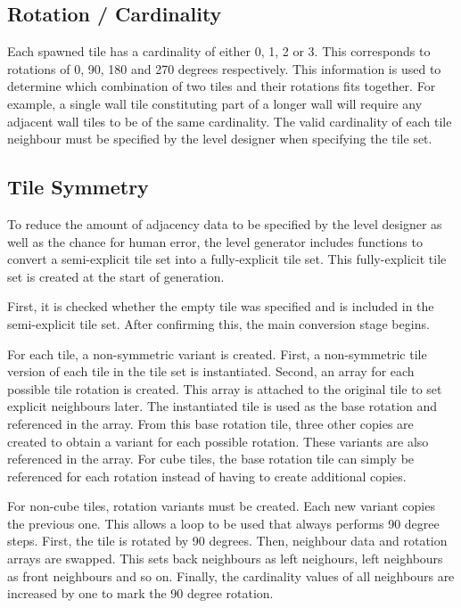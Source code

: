 \subsection{Rotation / Cardinality}
Each spawned tile has a cardinality of either 0, 1, 2 or 3. This corresponds to rotations of 0, 90, 180 and 270 degrees respectively. This information is used to determine which combination of two tiles and their rotations fits together. For example, a single wall tile constituting part of a longer wall will require any adjacent wall tiles to be of the same cardinality. The valid cardinality of each tile neighbour must be specified by the level designer when specifying the tile set.

\subsection{Tile Symmetry}\label{sec:tileSymmetry}
To reduce the amount of adjacency data to be specified by the level designer as well as the chance for human error, the level generator includes functions to convert a semi-explicit tile set into a fully-explicit tile set. This fully-explicit tile set is created at the start of generation.

First, it is checked whether the empty tile was specified and is included in the semi-explicit tile set. After confirming this, the main conversion stage begins.

For each tile, a non-symmetric variant is created. First, a non-symmetric tile version of each tile in the tile set is instantiated. Second, an array for each possible tile rotation is created. This array is attached to the original tile to set explicit neighbours later. The instantiated tile is used as the base rotation and referenced in the array. From this base rotation tile, three other copies are created to obtain a variant for each possible rotation. These variants are also referenced in the array. For cube tiles, the base rotation tile can simply be referenced for each rotation instead of having to create additional copies.


For non-cube tiles, rotation variants must be created. Each new variant copies the previous one. This allows a loop to be used that always performs 90 degree steps. First, the tile is rotated by 90 degrees. Then, neighbour data and rotation arrays are swapped. This sets back neighbours as left neighours, left neighbours as front neighbours and so on. Finally, the cardinality values of all neighbours are increased by one to mark the 90 degree rotation.

